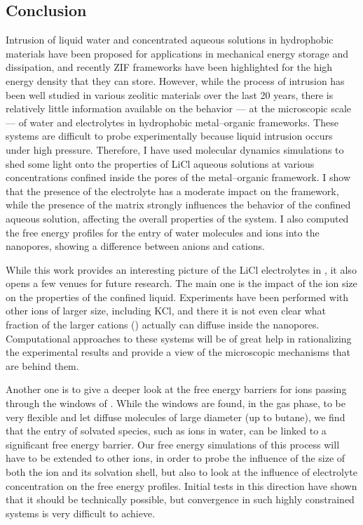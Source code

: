 \documentclass[thesis]{subfiles}
\begin{document}
\clearpage
\subsection*{Conclusion}

Intrusion of liquid water and concentrated aqueous solutions in hydrophobic
materials have been proposed for applications in mechanical energy storage and
dissipation, and recently ZIF frameworks have been highlighted for the high
energy density that they can store. However, while the process of intrusion has
been well studied in various zeolitic materials over the last 20 years, there is
relatively little information available on the behavior --- at the microscopic
scale --- of water and electrolytes in hydrophobic metal--organic frameworks.
These systems are difficult to probe experimentally because liquid intrusion
occurs under high pressure. Therefore, I have used molecular dynamics
simulations to shed some light onto the properties of LiCl aqueous solutions at
various concentrations confined inside the pores of the  metal--organic
framework. I show that the presence of the electrolyte has a moderate impact on
the  framework, while the presence of the  matrix strongly influences
the behavior of the confined aqueous solution, affecting the overall properties
of the system. I also computed the free energy profiles for the entry of water
molecules and ions into the nanopores, showing a difference between anions and
cations.

While this work provides an interesting picture of the LiCl electrolytes in
, it also opens a few venues for future research. The main one is the
impact of the ion size on the properties of the confined liquid. Experiments
have been performed with other ions of larger size, including KCl, and there it
is not even clear what fraction of the larger cations () actually can
diffuse inside the nanopores. Computational approaches to these systems will be
of great help in rationalizing the experimental results and provide a view of
the microscopic mechanisms that are behind them.

Another one is to give a deeper look at the free energy barriers for ions
passing through the windows of . While the windows are found, in the gas
phase, to be very flexible and let diffuse molecules of large diameter (up to
butane), we find that the entry of solvated species, such as ions in water, can
be linked to a significant free energy barrier. Our free energy simulations of
this process will have to be extended to other ions, in order to probe the
influence of the size of both the ion and its solvation shell, but also to look
at the influence of electrolyte concentration on the free energy profiles.
Initial tests in this direction have shown that it should be technically
possible, but convergence in such highly constrained systems is very difficult
to achieve.
\end{document}
